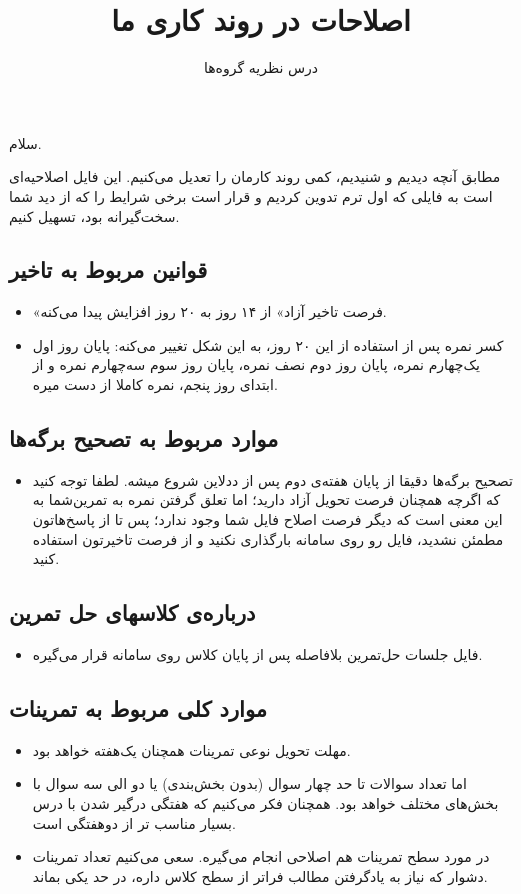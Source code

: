 \documentclass[a4paper, 12pt]{article}
\title{\textbf{
 اصلاحات در روند کاری ما
}}
\author{درس نظریه گروه‌ها}
\date{}
\begin{document}
\maketitle
سلام.

\noindent

مطابق آنچه دیدیم و شنیدیم، کمی روند کارمان را تعدیل می‌کنیم. این فایل اصلاحیه‌ای است به فایلی که اول ترم تدوین کردیم و قرار است برخی شرایط را که از دید شما سخت‌گیرانه بود، تسهیل کنیم.

\subsection*{قوانین مربوط به تاخیر }
		\begin{itemize}
	\item 
	«فرصت تاخیر آزاد» از ۱۴ روز به ۲۰ روز افزایش پیدا می‌کنه.
	\item
	کسر نمره پس از استفاده از این ۲۰ روز، به این شکل تغییر می‌کنه: پایان روز اول یک‌چهارم نمره، پایان روز دوم نصف نمره، پایان روز سوم سه‌چهارم نمره و از ابتدای روز پنجم، نمره‌ کاملا از دست میره.
	
\end{itemize}

\subsection*{موارد مربوط به تصحیح برگه‌ها}
\begin{itemize}
	\item 
	تصحیح برگه‌ها دقیقا از پایان‌ هفته‌ی دوم پس از ددلاین شروع میشه. لطفا توجه کنید که اگرچه همچنان فرصت تحویل آزاد دارید؛ اما تعلق گرفتن نمره به تمرین‌شما به این معنی‌ است که دیگر فرصت اصلاح فایل شما وجود ندارد؛ پس تا از پاسخ‌هاتون مطمئن نشدید، فایل رو روی سامانه بارگذاری نکنید و از فرصت تاخیرتون استفاده کنید.

\end{itemize}



\subsection*{درباره‌ی کلاسهای حل تمرین}
\begin{itemize}
	\item
	فایل جلسات حل‌تمرین بلافاصله پس از پایان کلاس روی سامانه قرار می‌گیره.
\end{itemize}

\subsection*{موارد کلی مربوط به تمرینات}
\begin{itemize}
	\item
	مهلت تحویل نوعی تمرینات همچنان یک‌هفته خواهد بود.
	\item
	اما تعداد سوالات تا حد چهار سوال (بدون بخش‌بندی) یا دو الی سه سوال با بخش‌های مختلف خواهد بود. همچنان فکر می‌کنیم که هفتگی درگیر شدن با درس بسیار مناسب تر از دوهفتگی است.
	
	\item 
	در مورد سطح تمرینات هم اصلاحی انجام می‌گیره. سعی می‌کنیم تعداد تمرینات دشوار که نیاز به یادگرفتن مطالب فراتر از سطح کلاس داره، در حد یکی بماند.
\end{itemize}
\end{document}
